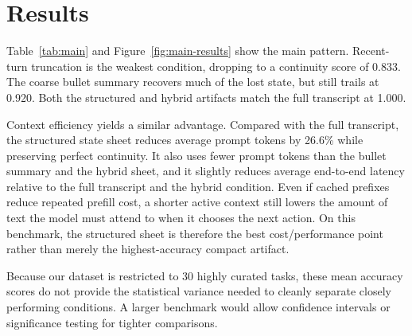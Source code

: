 \documentclass[11pt]{article}
\begin{document}
\section{Results}
\begin{table}[t]
\centering
\small
{}
\caption{Main results on \texttt{qwen3.5:4b}. ``Continuity'' is Task Continuity Score, the average accuracy across the five recovered fields. ``Avg. Latency'' is mean end-to-end seconds per call. ``Reduction'' is prompt-token reduction relative to C0. The structured sheet matches the full transcript while using fewer prompt tokens than the other compact artifacts.}
\label{tab:main}
\end{table}

Table~\ref{tab:main} and Figure~\ref{fig:main-results} show the main pattern. Recent-turn truncation is the weakest condition, dropping to a continuity score of 0.833. The coarse bullet summary recovers much of the lost state, but still trails at 0.920. Both the structured and hybrid artifacts match the full transcript at 1.000.

Context efficiency yields a similar advantage. Compared with the full transcript, the structured state sheet reduces average prompt tokens by 26.6\% while preserving perfect continuity. It also uses fewer prompt tokens than the bullet summary and the hybrid sheet, and it slightly reduces average end-to-end latency relative to the full transcript and the hybrid condition. Even if cached prefixes reduce repeated prefill cost, a shorter active context still lowers the amount of text the model must attend to when it chooses the next action. On this benchmark, the structured sheet is therefore the best cost/performance point rather than merely the highest-accuracy compact artifact.

Because our dataset is restricted to 30 highly curated tasks, these mean accuracy scores do not provide the statistical variance needed to cleanly separate closely performing conditions. A larger benchmark would allow confidence intervals or significance testing for tighter comparisons.
\end{document}
